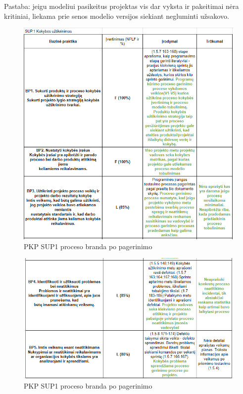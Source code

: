 \documentclass{VUMIFPSkursinis}
\begin{document}
	Pastaba: jeigu modeliui pasikeitus projektas vis dar vyksta ir pakeitimai nėra kritiniai, liekama prie senos modelio versijos siekiant negluminti užsakovo.	

	\begin{figure}[!htbp]
		\includegraphics[scale=0.9]{img/sup1one}
		\caption{PKP SUP1 proceso branda po pagerinimo} %
		\label{img:pkpPries}
	\end{figure}	

	\begin{figure}[!htbp]
		\includegraphics[scale=0.9]{img/sup1two}
		\caption{PKP SUP1 proceso branda po pagerinimo} %
		\label{img:pkpPries}
	\end{figure}	
\end{document}
